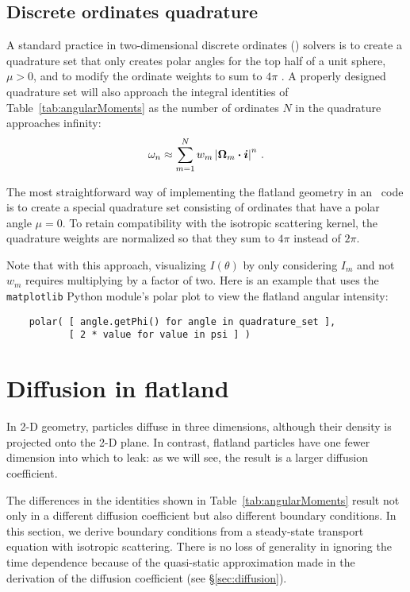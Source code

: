 \subsection{Discrete ordinates quadrature}

A standard practice in two-dimensional discrete ordinates (\SN) solvers is to
create a quadrature set that only creates polar angles for the top half of a
unit sphere, $\mu>0$, and to modify the ordinate weights to sum to $4\pi$
\cite{Zik1997}. A properly designed quadrature set will also approach the
integral identities of Table~\ref{tab:angularMoments} as the number of ordinates
$N$ in the quadrature approaches infinity:
\begin{equation*}
  \omega_n \approx \sum_{m=1}^{N} w_m \left|  \bm{\Omega}_m \bm{\cdot} \bm{i} \right|^n \,.
\end{equation*}

The most straightforward way of implementing the flatland geometry in an \SN\
code is to create a special quadrature set consisting of ordinates that have a
polar angle $\mu=0$. To retain compatibility with the isotropic scattering
kernel, the quadrature weights are normalized so that they sum to $4\pi$
instead of $2\pi$.

Note that with this approach, visualizing $I(\theta)$ by only considering
$I_m$ and not $w_m$ requires multiplying by a factor of two. Here is an
example that uses the \verb|matplotlib| Python module's polar plot to view
the flatland angular intensity:
\begin{verbatim}
    polar( [ angle.getPhi() for angle in quadrature_set ],
           [ 2 * value for value in psi ] )
\end{verbatim}

\section{Diffusion in flatland}

In 2-D geometry, particles diffuse in three dimensions, although their density
is projected onto the 2-D plane. In contrast, flatland particles have one fewer
dimension into which to leak: as we will see, the result is a larger diffusion
coefficient.

The differences in the identities shown in Table~\ref{tab:angularMoments}
result not
only in a different diffusion coefficient but also different boundary
conditions. In this section, we derive boundary conditions from a steady-state
transport equation with isotropic scattering. There is no loss of generality in
ignoring the time dependence because of the quasi-static approximation made in
the derivation of the diffusion coefficient (see \S\ref{sec:diffusion}).


